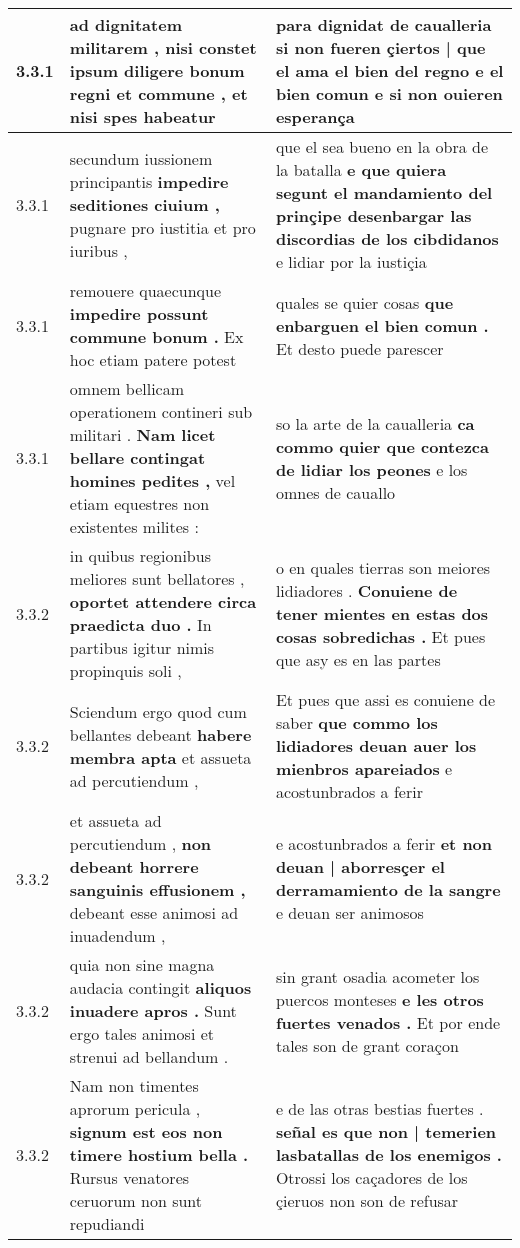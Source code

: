 \begin{tabular}{|p{1cm}|p{6.5cm}|p{6.5cm}|}
3.3.1 & ad dignitatem militarem , \textbf{ nisi constet ipsum diligere bonum regni et commune , } et nisi spes habeatur & para dignidat de caualleria \textbf{ si non fueren çiertos | que el ama el bien del regno e el bien comun } e si non ouieren esperança \\\hline
3.3.1 & secundum iussionem principantis \textbf{ impedire seditiones ciuium , } pugnare pro iustitia et pro iuribus , & que el sea bueno en la obra de la batalla \textbf{ e que quiera segunt el mandamiento del prinçipe desenbargar las discordias de los cibdidanos } e lidiar por la iustiçia \\\hline
3.3.1 & remouere quaecunque \textbf{ impedire possunt commune bonum . } Ex hoc etiam patere potest & quales se quier cosas \textbf{ que enbarguen el bien comun . } Et desto puede parescer \\\hline
3.3.1 & omnem bellicam operationem contineri sub militari . \textbf{ Nam licet bellare contingat homines pedites , } vel etiam equestres non existentes milites : & so la arte de la caualleria \textbf{ ca commo quier que contezca de lidiar los peones } e los omnes de cauallo \\\hline
3.3.2 & in quibus regionibus meliores sunt bellatores , \textbf{ oportet attendere circa praedicta duo . } In partibus igitur nimis propinquis soli , & o en quales tierras son meiores lidiadores . \textbf{ Conuiene de tener mientes en estas dos cosas sobredichas . } Et pues que asy es en las partes \\\hline
3.3.2 & Sciendum ergo quod cum bellantes debeant \textbf{ habere membra apta } et assueta ad percutiendum , & Et pues que assi es conuiene de saber \textbf{ que commo los lidiadores deuan auer los mienbros apareiados } e acostunbrados a ferir \\\hline
3.3.2 & et assueta ad percutiendum , \textbf{ non debeant horrere sanguinis effusionem , } debeant esse animosi ad inuadendum , & e acostunbrados a ferir \textbf{ et non deuan | aborresçer el derramamiento de la sangre } e deuan ser animosos \\\hline
3.3.2 & quia non sine magna audacia contingit \textbf{ aliquos inuadere apros . } Sunt ergo tales animosi et strenui ad bellandum . & sin grant osadia acometer los puercos monteses \textbf{ e les otros fuertes venados . } Et por ende tales son de grant coraçon \\\hline
3.3.2 & Nam non timentes aprorum pericula , \textbf{ signum est eos non timere hostium bella . } Rursus venatores ceruorum non sunt repudiandi & e de las otras bestias fuertes . \textbf{ señal es que non | temerien lasbatallas de los enemigos . } Otrossi los caçadores de los çieruos non son de refusar \\\hline

\end{tabular}
